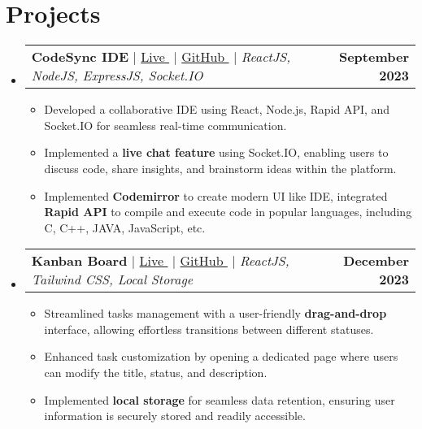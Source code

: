 \documentclass[letterpaper,11pt]{article}
\makeatletter
\newcommand{\resumeItem}[1]{
  \item\small{
    {#1 \vspace{-2pt}}
  }
}
\newcommand{\resumeProjectHeading}[2]{
    \item
    \begin{tabular*}{1.001\textwidth}{l@{\extracolsep{\fill}}r}
      \small#1 & \textbf{\small #2}\\
    \end{tabular*}\vspace{-7pt}
}
\newcommand{\resumeSubHeadingListStart}{\begin{itemize}[leftmargin=0.0in, label={}]}
\newcommand{\resumeItemListStart}{\begin{itemize}}
\newcommand{\resumeItemListEnd}{\end{itemize}\vspace{-5pt}}
\makeatother
\begin{document}
\section{Projects}
    \vspace{-5pt}
    \resumeSubHeadingListStart
    \resumeProjectHeading 
        {\textbf{{CodeSync IDE}} $|$ \href{https://codesyncide.vercel.app}{Live $ $}{\faExternalLink} $|$ $ $\href{https://github.com/keshavop/CodeSync-IDE}{GitHub $ $}{\faExternalLink} $|$ \emph{ReactJS, NodeJS, ExpressJS, Socket.IO}}
        {September 2023}
        \resumeItemListStart
        \vspace{1pt}
          \resumeItem{Developed a collaborative IDE using React, Node.js, Rapid API,  and Socket.IO for seamless  real-time communication.}
          \vspace{1pt}
          \resumeItem{Implemented a \textbf{live chat feature} using Socket.IO, enabling users to discuss code, share insights, and brainstorm ideas within the platform. }
          \vspace{1pt}
          \resumeItem{Implemented \textbf{Codemirror} to create modern UI like IDE, integrated \textbf{Rapid API} to compile and execute code in popular languages, including C, C++, JAVA, JavaScript, etc. }
          \vspace{1pt}
        \resumeItemListEnd
        \vspace{-16pt}
    
    \resumeProjectHeading
        {\textbf{{Kanban Board}} $|$ \href{https://kanbanboardop.vercel.app}{Live $ $}{\faExternalLink} $|$ $ $\href{https://github.com/keshavop/Kanban-Board}{GitHub $ $}{\faExternalLink} $|$ \emph{ReactJS, Tailwind CSS, Local Storage}}
        {December 2023}
        \resumeItemListStart
        \vspace{1pt}
          \resumeItem{Streamlined tasks management with a user-friendly \textbf{drag-and-drop} interface, allowing effortless transitions between different statuses.}
          \vspace{1pt}
          \resumeItem{Enhanced task customization by opening a dedicated page where users can modify the title, status, and description.}
          \vspace{1pt}
          \resumeItem{ Implemented \textbf{local storage} for seamless data retention, ensuring user information is securely stored and readily accessible.}
          \vspace{1pt}
        \resumeItemListEnd
        \vspace{-16pt}
        \resumeItemListEnd\textit{}
\vspace{-3pt}
\end{document}
